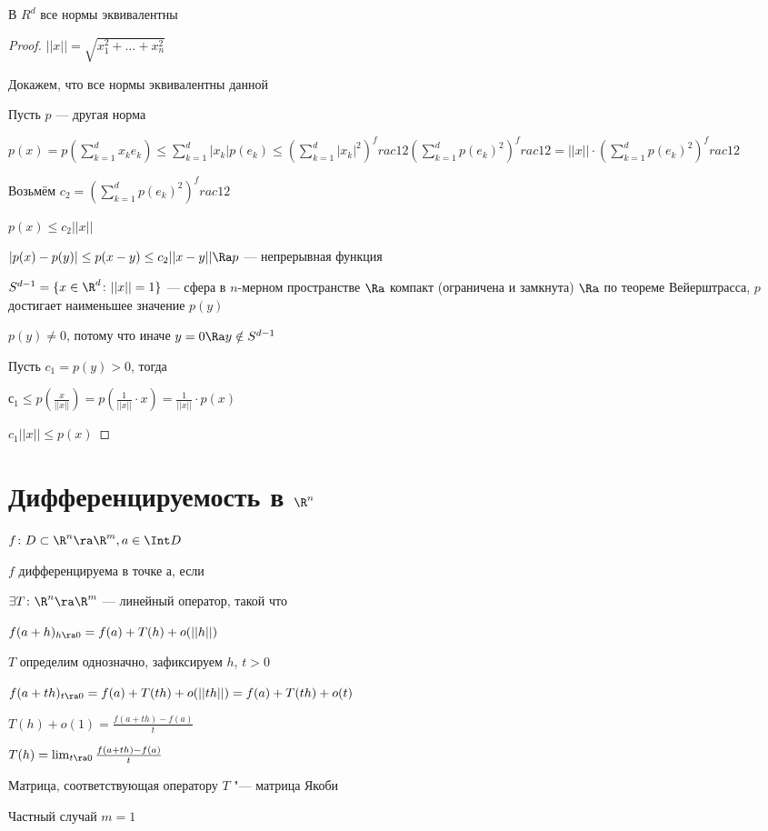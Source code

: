 \begin{theorem}
В  $R^d$ все нормы эквивалентны
\end{theorem}

\begin{proof}
$||x|| = \sqrt{x_1^2 + \dots + x_n^2}$

Докажем, что все нормы эквивалентны данной

Пусть $p$ --- другая норма

$p(x) = p(\sum_{k = 1}^d x_k e_k) \le \sum_{k = 1}^d |x_k| p(e_k) \le (\sum_{k = 1}^d |x_k|^2)^frac{1}{2} (\sum_{k = 1}^d p(e_k)^2)^frac{1}{2} = ||x|| \cdot (\sum_{k = 1}^d p(e_k)^2)^frac{1}{2}$

Возьмём $c_2 = (\sum_{k = 1}^d p(e_k)^2)^frac{1}{2}$

$p(x) \le c_2 ||x||$

$|p(x) - p(y)| \le p(x - y) \le c_2 ||x - y|| \Ra p$ --- непрерывная функция

$S^{d - 1} = \{x\in \R^d \colon ||x|| = 1\}$ --- сфера в $n$-мерном пространстве $\Ra$ компакт (ограничена и замкнута) $\Ra$ по теореме Вейерштрасса, $p$ достигает наименьшее значение $p(y)$

$p(y) \neq 0$, потому что иначе $y = 0 \Ra y \notin S^{d - 1}$

Пусть $c_1 = p(y) > 0$, тогда

$с_1 \le p(\frac{x}{||x||}) = p(\frac{1}{||x||} \cdot x) = \frac{1}{||x||} \cdot p(x)$

$c_1||x|| \le p(x)$
\end{proof}

\section{Дифференцируемость в $\R^n$}

\begin{Def}
$f \colon D \subset \R^n \ra \R^m, a \in \Int D$

$f$ дифференцируема в точке а, если

$\exists T \colon \R^n \ra \R^m$ --- линейный оператор, такой что

$f(a + h)_{h \ra 0} = f(a) + T(h) + o(||h||)$
\end{Def}
\begin{Rem}
$T$ определим однозначно, зафиксируем $h$, $t > 0$

$f(a + th)_{t \ra 0} = f(a) + T(th) + o(||th||) = f(a) + T(th) + o(t)$

$T(h) + o(1) = \frac{f(a + th) - f(a)}{t}$

$T(h) = \lim_{t \ra 0} \frac{f(a + th) - f(a)}{t}$
\end{Rem}
\begin{Def}
Матрица, соответствующая оператору $T$ "--- матрица Якоби
\end{Def}
Частный случай $m = 1$

